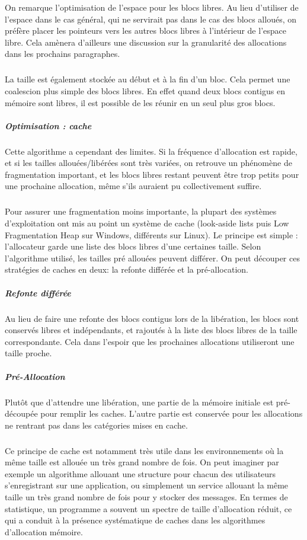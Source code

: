 On remarque l'optimisation de l'espace pour les blocs libres. Au lieu d'utiliser de l'espace dans le cas général, qui ne servirait pas dans le cas des blocs alloués,
on préfère placer les pointeurs vers les autres blocs libres à l'intérieur de l'espace libre. Cela amènera d'ailleurs une discussion sur la granularité des allocations dans
les prochains paragraphes.
\subparagraph{}
La taille est également stockée au début et à la fin d'un bloc. Cela permet une coalescion plus simple des blocs libres. En effet quand deux blocs contigus en
mémoire sont libres, il est possible de les réunir en un seul plus gros blocs.

\subparagraph{Optimisation : cache}
Cette algorithme a cependant des limites. Si la fréquence d'allocation est rapide, et si les tailles allouées/libérées sont très variées, on retrouve un phénomène de
fragmentation important, et les blocs libres restant peuvent être trop petits pour une prochaine allocation, même s'ils auraient pu collectivement suffire.
\subparagraph{}
Pour assurer une fragmentation moins importante, la plupart des systèmes d'exploitation ont mis au point un système de cache (look-aside lists puis Low Fragmentation Heap sur Windows, différents sur Linux).
Le principe est simple : l'allocateur garde une liste des blocs libres d'une certaines taille. Selon l'algorithme utilisé, les tailles pré allouées peuvent différer.
On peut découper ces stratégies de caches en deux: la refonte différée et la pré-allocation.

\subparagraph{Refonte différée}
Au lieu de faire une refonte des blocs contigus lors de la libération, les blocs sont conservés libres et indépendants, et rajoutés à la liste des blocs libres de
la taille correspondante. Cela dans l'espoir que les prochaines allocations utiliseront une taille proche.

\subparagraph{Pré-Allocation}
Plutôt que d'attendre une libération, une partie de la mémoire initiale est pré-découpée pour remplir les caches. L'autre partie est conservée pour les allocations
ne rentrant pas dans les catégories mises en cache.

\subparagraph{}
Ce principe de cache est notamment très utile dans les environnements où la même taille est allouée un très grand nombre de fois. On peut imaginer par exemple un
algorithme allouant une structure pour chacun des utilisateurs s'enregistrant sur une application, ou simplement un service allouant la même taille un très grand nombre
de fois pour y stocker des messages. En termes de statistique, un programme a souvent un spectre de taille d'allocation réduit, ce qui a conduit à la présence systématique de
caches dans les algorithmes d'allocation mémoire.


